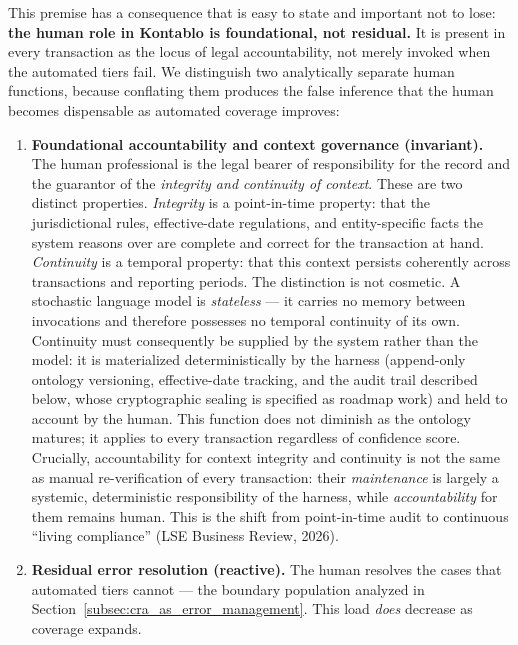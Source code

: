 This premise has a consequence that is easy to state and important not to
lose: \textbf{the human role in Kontablo is foundational, not residual.} It is
present in every transaction as the locus of legal accountability, not merely
invoked when the automated tiers fail. We distinguish two analytically
separate human functions, because conflating them produces the false inference
that the human becomes dispensable as automated coverage improves:

\begin{enumerate}
    \item \textbf{Foundational accountability and context governance
    (invariant).} The human professional is the legal bearer of
    responsibility for the record and the guarantor of the \emph{integrity and
    continuity of context}. These are two distinct properties. \emph{Integrity}
    is a point-in-time property: that the jurisdictional rules, effective-date
    regulations, and entity-specific facts the system reasons over are complete
    and correct for the transaction at hand. \emph{Continuity} is a temporal
    property: that this context persists coherently across transactions and
    reporting periods. The distinction is not cosmetic. A stochastic language
    model is \emph{stateless} --- it carries no memory between invocations and
    therefore possesses no temporal continuity of its own. Continuity must
    consequently be supplied by the system rather than the model: it is
    materialized deterministically by the harness (append-only ontology
    versioning, effective-date tracking, and the audit trail described below,
    whose cryptographic sealing is specified as roadmap work) and held to
    account by the human. This function does not diminish as the ontology matures; it applies
    to every transaction regardless of confidence score. Crucially,
    accountability for context integrity and continuity is not the same as
    manual re-verification of every transaction: their \emph{maintenance} is
    largely a systemic, deterministic responsibility of the harness, while
    \emph{accountability} for them remains human. This is the shift from
    point-in-time audit to continuous ``living compliance'' (LSE Business
    Review, 2026).
    \item \textbf{Residual error resolution (reactive).} The human resolves
    the cases that automated tiers cannot --- the boundary population analyzed
    in Section~\ref{subsec:cra_as_error_management}. This load \emph{does}
    decrease as coverage expands.
\end{enumerate}

